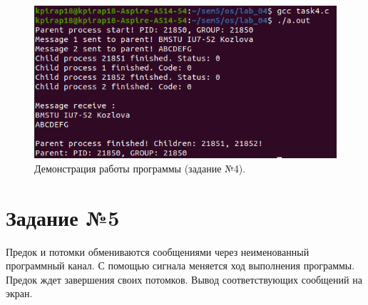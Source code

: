 \documentclass[12pt]{report}
\begin{document}
\begin{figure}[H]

	\centering

	\includegraphics[width=\linewidth]{img/p4.png}
	\caption{Демонстрация работы программы (задание №4).}

	\label{fig:p4}

\end{figure}

\section*{Задание №5}

Предок и потомки обмениваются сообщениями через неименованный программный канал. С помощью сигнала меняется ход выполнения программы. Предок ждет завершения своих потомков. Вывод соответствующих сообщений на экран.
\end{document}

